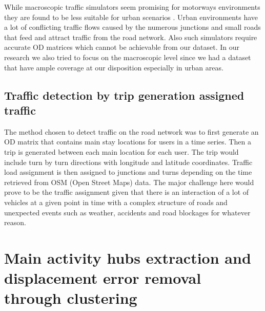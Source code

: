 \documentclass[12pt, a4paper]{report}
\theoremstyle{definition}
\theoremstyle{definition}%
\theoremstyle{definition}%
\theoremstyle{definition}%
\theoremstyle{definition}%
\theoremstyle{definition}%
\begin{document}
While macroscopic traffic simulators seem promising for motorways environments they are found to be less suitable for urban scenarios \cite{Bazghandi2012}. Urban environments have a lot of conflicting traffic flows caused by the numerous junctions and small roads that feed and attract traffic from the road network. Also such simulators require accurate OD matrices which cannot be achievable from our dataset. In our research we also tried to focus on the macroscopic level since we had a dataset that have ample coverage at our disposition especially in urban areas.    


\subsection{Traffic detection by trip generation assigned traffic} \label{subsection:methodology:trip_generation}
The method chosen to detect traffic on the road network was to first generate an OD matrix that contains main stay locations for users in a time series. Then a trip is generated between each main location for each user. The trip would include turn by turn directions with longitude and latitude coordinates. Traffic load assignment is then assigned to junctions and turns depending on the time retrieved from OSM (Open Street Maps) data. The major challenge here would prove to be the traffic assignment given that there is an interaction of a lot of vehicles at a given point in time with a complex structure of roads and unexpected events such as weather, accidents and road blockages for whatever reason. 


\section{Main activity hubs extraction and displacement error removal through clustering} \label{section:methodology:clustering}
\end{document}
